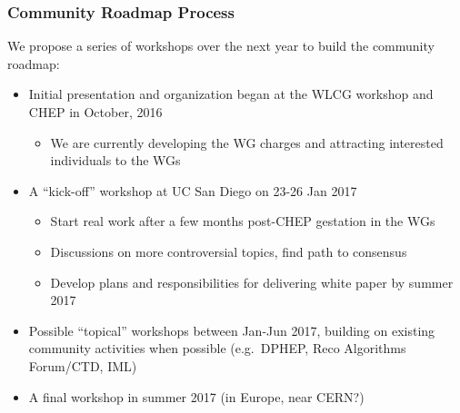 \begin{frame}
\frametitle{Community Roadmap Process}

We propose a series of workshops over the next year to build the community roadmap:

\begin{itemize}
\item Initial presentation and organization began at the WLCG workshop and CHEP in October, 2016
  \begin{itemize}
  \item We are currently developing the WG charges and attracting interested individuals to the WGs
  \end{itemize}
\item A ``kick-off'' workshop at UC San Diego on 23-26 Jan 2017
  \begin{itemize}
  \item Start real work after a few months post-CHEP gestation in the WGs
  \item Discussions on more controversial topics, find path to consensus
  \item Develop plans and responsibilities for delivering white paper by summer 2017
  \end{itemize}
\item Possible ``topical'' workshops between Jan-Jun 2017, building on existing community activities when possible (e.g.\ DPHEP, Reco Algorithms Forum/CTD, IML)
\item A final workshop in summer 2017 (in Europe, near CERN?)
\end{itemize}

\end{frame}


